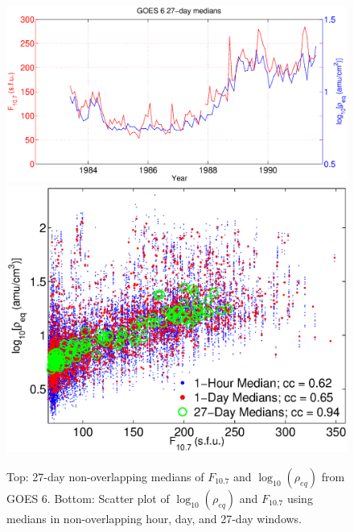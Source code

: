 \documentclass[12pt]{article}
\begin{document}
\begin{figure}[htp!]
\centering
\includegraphics[scale=0.40]{figures/F107MD27d-GOES6.eps}
\includegraphics[scale=0.40]{figures/ccplot-GOES6.eps}
\caption{Top: 27-day non-overlapping medians of $F_{10.7}$ and $\log_{10}(\rho_{eq})$ from GOES 6. Bottom: Scatter plot of $\log_{10}(\rho_{eq})$ and $F_{10.7}$ using medians in non-overlapping hour, day, and 27-day windows.}
\label{fig:ccplot}
\end{figure}
\clearpage
\end{document}
